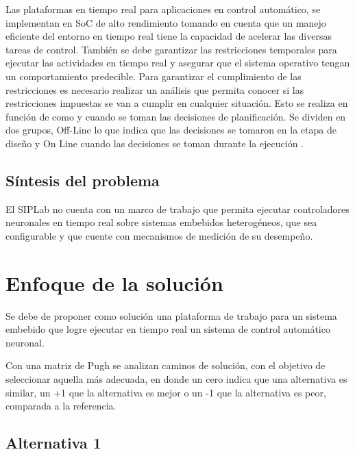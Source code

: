\documentclass[12pt]{article}
\begin{document}
Las plataformas en tiempo real para aplicaciones en control automático, se implementan en SoC de alto rendimiento tomando en cuenta que un manejo eficiente del entorno en tiempo real tiene la capacidad de acelerar las diversas tareas de control. También se debe garantizar las restricciones temporales para ejecutar las actividades en tiempo real y asegurar que el sistema operativo tengan un comportamiento predecible. Para garantizar el cumplimiento de las restricciones es necesario realizar un análisis que permita conocer si las restricciones impuestas se van a cumplir en cualquier situación. Esto se realiza en función de como y cuando se toman las decisiones de planificación. Se dividen en dos grupos, Off-Line lo que indica que las decisiones se tomaron en la etapa de diseño y On Line cuando las decisiones se toman durante la ejecución \cite{munoz1994extensiones} \cite{alonso2010panoramica}.


\subsection{Síntesis del problema}

El SIPLab no cuenta con un marco de trabajo que permita ejecutar controladores neuronales en tiempo real sobre sistemas embebidos heterogéneos, que sea configurable y que cuente con mecanismos de medición de su desempeño.


\section{Enfoque de la solución}

Se debe de proponer como solución una plataforma de trabajo para un sistema embebido que logre ejecutar en tiempo real un sistema de control automático neuronal.


Con una matriz de Pugh se analizan caminos de solución, con el objetivo de seleccionar aquella más adecuada, en donde un cero indica que una alternativa es similar, un +1 que la alternativa es mejor o un -1 que la alternativa es peor, comparada a la referencia.

\subsection{Alternativa 1}

\end{document}
